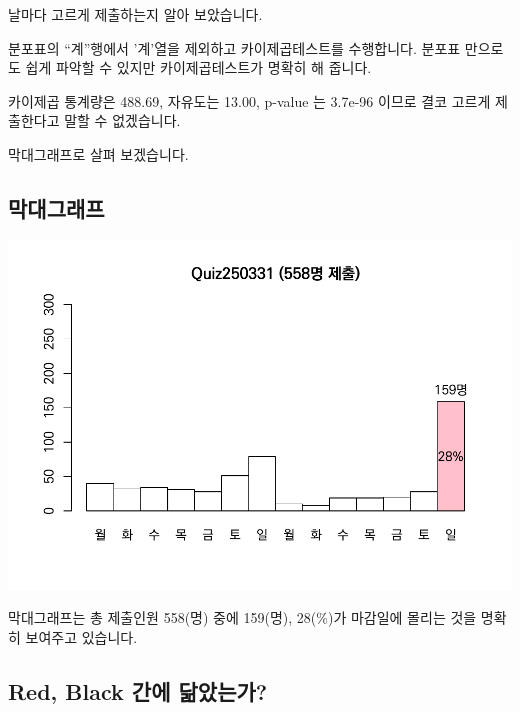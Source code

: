 \documentclass[
]{book}
\begin{document}
날마다 고르게 제출하는지 알아 보았습니다.

분포표의 ``계''행에서 '계'열을 제외하고 카이제곱테스트를 수행합니다. 분포표 만으로도 쉽게 파악할 수 있지만 카이제곱테스트가 명확히 해 줍니다.

카이제곱 통계량은 488.69, 자유도는 13.00, p-value 는 3.7e-96 이므로 결코 고르게 제출한다고 말할 수 없겠습니다.

막대그래프로 살펴 보겠습니다.

\subsection{막대그래프}\label{uxb9c9uxb300uxadf8uxb798uxd504-4}

\includegraphics{Quiz_report_2025_files/figure-latex/unnamed-chunk-119-1.pdf}

막대그래프는 총 제출인원 558(명) 중에 159(명), 28(\%)가 마감일에 몰리는 것을 명확히 보여주고 있습니다.

\subsection{Red, Black 간에 닮았는가?}\label{red-black-uxac04uxc5d0-uxb2eeuxc558uxb294uxac00-4}
\end{document}
